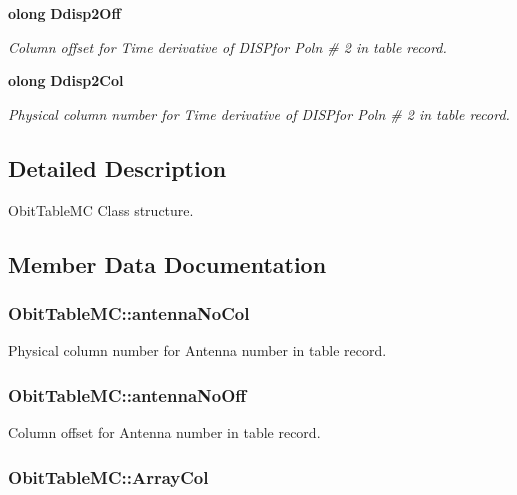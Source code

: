 \begin{CompactItemize}
{\bf olong} {\bf Ddisp2Off}
\begin{CompactList}\small\item\em Column offset for Time derivative of DISPfor Poln \# 2 in table record. \item\end{CompactList}\item 
{\bf olong} {\bf Ddisp2Col}
\begin{CompactList}\small\item\em Physical column number for Time derivative of DISPfor Poln \# 2 in table record. \item\end{CompactList}\end{CompactItemize}


\subsection{Detailed Description}
Obit\-Table\-MC Class structure. 



\subsection{Member Data Documentation}
\subsubsection{ {\bf Obit\-Table\-MC::antenna\-No\-Col}}\label{structObitTableMC_o35}


Physical column number for Antenna number in table record. 

\subsubsection{ {\bf Obit\-Table\-MC::antenna\-No\-Off}}\label{structObitTableMC_o34}


Column offset for Antenna number in table record. 

\subsubsection{ {\bf Obit\-Table\-MC::Array\-Col}}\label{structObitTableMC_o37}



